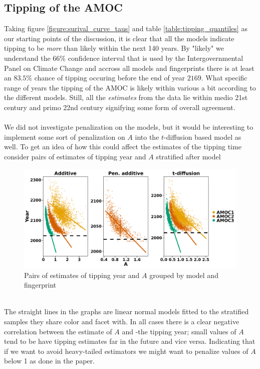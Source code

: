 \subsection{Tipping of the AMOC}
Taking figure \ref{figure:surival_curve_taus} and table \ref{table:tipping_quantiles} as our starting points of the discussion, it is clear that all the models indicate tipping to be \textit{more} than likely within the next 140 years. By "likely" we understand the 66\% confidence interval that is used by the Intergovernmental Panel on Climate Change \cite{Ditlevsen2023} and accross all models and fingerprints there is at least an $83.5\%$ chance of tipping occuring before the end of year $2169$. What specific range of years the tipping of the AMOC is likely within various a bit according to the different models. Still, all the \textit{estimates} from the data lie within medio 21st century and primo 22nd century signifying some form of overall agreement.\\\\
We did not investigate penalization on the models, but it would be interesting to implement some sort of penalization on $A$ into the $t$-diffusion based model as well. To get an idea of how this could affect the estimates of the tipping time consider pairs of estimates of tipping year and $A$ stratified after model
\begin{figure}[h!]
    \begin{center}
    \includegraphics[scale = .082]{figures/correlation_between_A_and_tau_plot.jpeg}
    \caption{Pairs of estimates of tipping year and $A$ grouped by model and fingerprint}
    \label{figure:correlation_A_and_tau}
\end{center}
\end{figure}\\
The straight lines in the graphs are linear normal models fitted to the stratified samples they share color and facet with. In all cases there is a clear negative correlation between the estimate of $A$ and -the tipping year; small values of $A$ tend to be have tipping estimates far in the future and vice versa. Indicating that if we want to avoid heavy-tailed estimators we might want to penalize values of $A$ below 1 as done in the paper.

